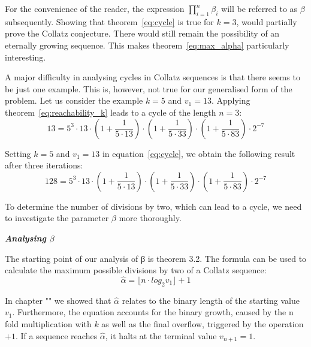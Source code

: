 \documentclass{SciPress_2015}
\renewcommand{\subsection}[1]{\textit{\textbf{#1}}}
\begin{document}
\par\medskip
For the convenience of the reader, the expression $\prod_{i=1}^{n}\beta_i$ will be referred to as $\beta$ subsequently. Showing that theorem~\ref{eq:cycle} is true for $k=3$, would partially prove the Collatz conjecture. There would still remain the possibility of an eternally growing sequence. This makes theorem~\ref{eq:max_alpha} particularly interesting.

\par\medskip
A major difficulty in analysing cycles in Collatz sequences is that there seems to be just one example. This is, however, not true for our generalised form of the problem. Let us consider the example $k=5$ and $v_1=13$. Applying theorem~\ref{eq:reachability_k} leads to a cycle of the length $n=3$:
\[
13=5^3\cdot13\cdot\left(1+\frac{1}{5\cdot13}\right)\cdot\left(1+\frac{1}{5\cdot33}\right)\cdot\left(1+\frac{1}{5\cdot83}\right)\cdot2^{-7}
\]

Setting $k=5$ and $v_1=13$ in equation~\ref{eq:cycle}, we obtain the following result after three iterations:
\[
128=5^3\cdot13\cdot\left(1+\frac{1}{5\cdot13}\right)\cdot\left(1+\frac{1}{5\cdot33}\right)\cdot\left(1+\frac{1}{5\cdot83}\right)\cdot2^{-7}
\]

To determine the number of divisions by two, which can lead to a cycle, we need to investigate the parameter $\beta$ more thoroughly.

\vspace{1em}\noindent
\subsection{Analysing \boldmath$\beta$}
\par\noindent
The starting point of our analysis of β is theorem 3.2. The formula can be used to calculate the maximum possible divisions by two of a Collatz sequence:
\[
\hat\alpha=\lfloor n\cdot log_2v_1\rfloor+1
\]

In chapter "" we showed that $\hat\alpha$ relates to the binary length of the starting value $v_1$. Furthermore, the equation accounts for the binary growth, caused by the n fold multiplication with $k$ as well as the final overflow, triggered by the operation $+1$. If a sequence reaches $\hat\alpha$, it halts at the terminal value $v_{n+1}=1$.
\end{document}
